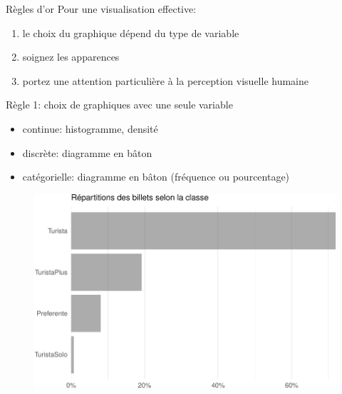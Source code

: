 \documentclass[
  ignorenonframetext,
]{beamer}
\providecommand{\tightlist}{%
  \setlength{\itemsep}{0pt}\setlength{\parskip}{0pt}}\usepackage{longtable,booktabs,array}
\begin{document}
\begin{frame}{Règles d'or}
\protect\hypertarget{ruxe8gles-dor}{}
Pour une visualisation effective:

\begin{enumerate}
\tightlist
\item
  le choix du graphique dépend du type de variable
\item
  soignez les apparences
\item
  portez une attention particulière à la perception visuelle humaine
\end{enumerate}
\end{frame}

\begin{frame}{Règle 1: choix de graphiques avec une seule variable}
\protect\hypertarget{ruxe8gle-1-choix-de-graphiques-avec-une-seule-variable}{}
\begin{itemize}
\tightlist
\item
  continue: histogramme, densité
\item
  discrète: diagramme en bâton
\item
  catégorielle: diagramme en bâton (fréquence ou pourcentage)
\end{itemize}
\end{frame}

\begin{frame}
\begin{figure}

{\centering \includegraphics{MATH60602-diapos1_files/figure-beamer/figure-renfe_barplot-1.pdf}

}

\end{figure}
\end{frame}
\end{document}
